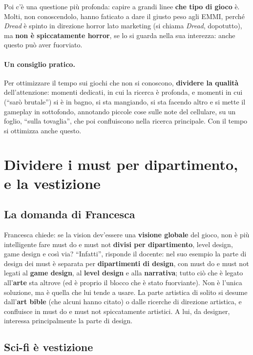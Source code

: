 Poi c'è una questione più profonda: capire a grandi linee \textbf{che tipo
di gioco} è. Molti, non conoscendolo, hanno faticato a dare il giusto peso
agli EMMI, perché \emph{Dread} è spinto in direzione horror lato marketing
(si chiama \emph{Dread}, dopotutto), ma \textbf{non è spiccatamente horror},
se lo si guarda nella sua interezza: anche questo può aver fuorviato.

\paragraph{Un consiglio pratico.} Per ottimizzare il tempo sui giochi che
non si conoscono, \textbf{dividere la qualità} dell'attenzione: momenti
dedicati, in cui la ricerca è profonda, e momenti in cui (``sarò brutale'')
si è in bagno, si sta mangiando, si sta facendo altro e si mette il gameplay
in sottofondo, annotando piccole cose sulle note del cellulare, su un foglio,
``sulla tovaglia'', che poi confluiscono nella ricerca principale. Con il
tempo si ottimizza anche questo.

\section{Dividere i must per dipartimento, e la vestizione}
\label{gd15:sec:dipartimenti}

\subsection{La domanda di Francesca}

Francesca chiede: se la vision dev'essere una \textbf{visione globale} del
gioco, non è più intelligente fare must do e must not \textbf{divisi per
dipartimento}, level design, game design e così via? ``Infatti'', risponde
il docente: nel suo esempio la parte di design dei must è separata per
\textbf{dipartimenti di design}, con must do e must not legati al
\textbf{game design}, al \textbf{level design} e alla \textbf{narrativa};
tutto ciò che è legato all'\textbf{arte} sta altrove (ed è proprio il blocco
che è stato fuorviante). Non è l'unica soluzione, ma è quella che lui tende
a usare. La parte artistica di solito si desume dall'\textbf{art bible}
(che alcuni hanno citato) o dalle ricerche di direzione artistica, e confluisce
in must do e must not spiccatamente artistici. A lui, da designer, interessa
principalmente la parte di design.

\subsection{Sci-fi è vestizione}

